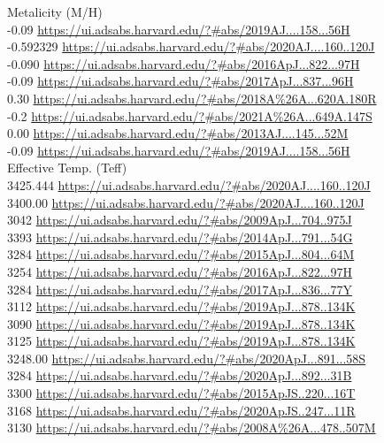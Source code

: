 Metalicity (M/H)\\
-0.09 \url{https://ui.adsabs.harvard.edu/?#abs/2019AJ....158...56H}\\
-0.592329 \url{https://ui.adsabs.harvard.edu/?#abs/2020AJ....160..120J}\\
-0.090 \url{https://ui.adsabs.harvard.edu/?#abs/2016ApJ...822...97H}\\
-0.09 \url{https://ui.adsabs.harvard.edu/?#abs/2017ApJ...837...96H}\\
0.30 \url{https://ui.adsabs.harvard.edu/?#abs/2018A%26A...620A.180R}\\
-0.2 \url{https://ui.adsabs.harvard.edu/?#abs/2021A%26A...649A.147S}\\
0.00 \url{https://ui.adsabs.harvard.edu/?#abs/2013AJ....145...52M}\\
-0.09 \url{https://ui.adsabs.harvard.edu/?#abs/2019AJ....158...56H}\\
Effective Temp. (Teff)\\
3425.444 \url{https://ui.adsabs.harvard.edu/?#abs/2020AJ....160..120J}\\
3400.00 \url{https://ui.adsabs.harvard.edu/?#abs/2020AJ....160..120J}\\
3042 \url{https://ui.adsabs.harvard.edu/?#abs/2009ApJ...704..975J}\\
3393 \url{https://ui.adsabs.harvard.edu/?#abs/2014ApJ...791...54G}\\
3284 \url{https://ui.adsabs.harvard.edu/?#abs/2015ApJ...804...64M}\\
3254 \url{https://ui.adsabs.harvard.edu/?#abs/2016ApJ...822...97H }\\
3284 \url{https://ui.adsabs.harvard.edu/?#abs/2017ApJ...836...77Y}\\
3112 \url{https://ui.adsabs.harvard.edu/?#abs/2019ApJ...878..134K}\\
3090 \url{https://ui.adsabs.harvard.edu/?#abs/2019ApJ...878..134K}\\
3125 \url{https://ui.adsabs.harvard.edu/?#abs/2019ApJ...878..134K}\\
3248.00 \url{https://ui.adsabs.harvard.edu/?#abs/2020ApJ...891...58S}\\
3284 \url{https://ui.adsabs.harvard.edu/?#abs/2020ApJ...892...31B}\\
3300 \url{https://ui.adsabs.harvard.edu/?#abs/2015ApJS..220...16T}\\
3168 \url{https://ui.adsabs.harvard.edu/?#abs/2020ApJS..247...11R}\\
3130 \url{https://ui.adsabs.harvard.edu/?#abs/2008A%26A...478..507M}\\
